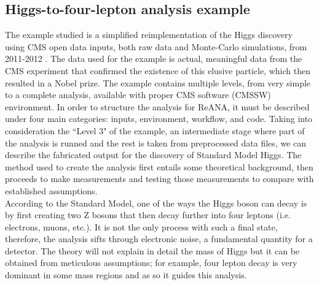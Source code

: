 \documentclass[letter]{article}
\newcommand\tab[1][1cm]{\hspace*{#1}}
\begin{document}
\subsection{Higgs-to-four-lepton analysis example}
\tab The example studied is a simplified reimplementation of the Higgs discovery using CMS open data inputs, both raw data and Monte-Carlo simulations, from 2011-2012 \cite{higgs}. The data used for the example is actual, meaningful data from the CMS experiment that confirmed the existence of this elusive particle, which then resulted in a Nobel prize. The example contains multiple levels, from very simple to a complete analysis, available with proper CMS software (CMSSW) environment. In order to structure the analysis for ReANA, it must be described under four main categories: inputs, environment, workflow, and code. Taking into consideration the ``Level 3" of the example, an intermediate stage where part of the analysis is runned and the rest is taken from preprocessed data files, we can describe the fabricated output for the discovery of Standard Model Higgs. The method used to create the analysis first entails some theoretical background, then proceeds to make measurements and testing those measurements to compare with established assumptions.\vspace{5pt}
\\ 
\tab According to the Standard Model, one of the ways the Higgs boson can decay is by first creating two Z bosons that then decay further into four leptons (i.e. electrons, muons, etc.). It is not the only process with such a final state, therefore, the analysis sifts through electronic noise, a fundamental quantity for a detector. The theory will not explain in detail the mass of Higgs but it can be obtained from meticulous assumptions; for example, four lepton decay is very dominant in some mass regions and as so it guides this analysis.
\end{document}
